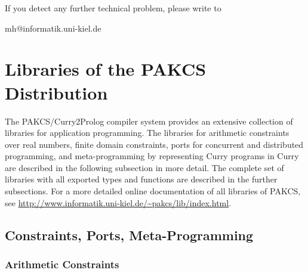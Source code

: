\documentclass[11pt,fleqn]{article}
\renewcommand{\tt}{\usefont{OT1}{cmtt}{m}{n}\selectfont}
\newcommand{\codefont}{\tt}
\newcommand{\code}[1]{\mbox{\codefont #1}}
\begin{document}
If you detect any further technical problem,
please write to
\begin{center}
\code{mh@informatik.uni-kiel.de}
\end{center}

\newpage




\newpage
\appendix

\section{Libraries of the PAKCS Distribution}
\label{sec:libraries}

{\setlength{\parindent}{0.0cm}

The PAKCS/Curry2Prolog compiler system provides an extensive collection
of libraries for application programming.
The libraries for arithmetic constraints over real numbers,
finite domain constraints,
ports for concurrent and distributed programming, and
meta-programming by representing Curry programs in Curry
are described in the following subsection in more detail.
The complete set of libraries with all exported types and functions
are described in the further subsections.
For a more detailed online documentation of all libraries of PAKCS,
see \url{http://www.informatik.uni-kiel.de/~pakcs/lib/index.html}.

\subsection{Constraints, Ports, Meta-Programming}

\subsubsection{Arithmetic Constraints}

}
\end{document}
